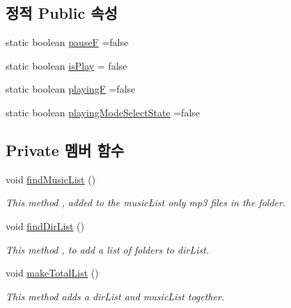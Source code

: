\subsection*{정적 Public 속성}
\begin{DoxyCompactItemize}
\item 
static boolean \hyperlink{classkr_1_1ac_1_1kookmin_1_1cs_1_1music_1_1_music_player_a9cbd432293e5e11088c6bfb4b31db11c}{pause\+F} =false
\item 
static boolean \hyperlink{classkr_1_1ac_1_1kookmin_1_1cs_1_1music_1_1_music_player_a51b544eb635ea19154536647d01a4994}{is\+Play} = false
\item 
static boolean \hyperlink{classkr_1_1ac_1_1kookmin_1_1cs_1_1music_1_1_music_player_af9d89823a5f820f1592ebe2acd21f711}{playing\+F} =false
\item 
static boolean \hyperlink{classkr_1_1ac_1_1kookmin_1_1cs_1_1music_1_1_music_player_ae2610567e63c44b6bba0eabdd1868e33}{playing\+Mode\+Select\+State} =false
\end{DoxyCompactItemize}
\subsection*{Private 멤버 함수}
\begin{DoxyCompactItemize}
\item 
void \hyperlink{classkr_1_1ac_1_1kookmin_1_1cs_1_1music_1_1_music_player_a51155c43158965823b24d0f69987be47}{find\+Music\+List} ()
\begin{DoxyCompactList}\small\item\em This method , added to the music\+List only mp3 files in the folder. \end{DoxyCompactList}\item 
void \hyperlink{classkr_1_1ac_1_1kookmin_1_1cs_1_1music_1_1_music_player_a449b2c9816ef1a55f8113b7155000d97}{find\+Dir\+List} ()
\begin{DoxyCompactList}\small\item\em This method , to add a list of folders to dir\+List. \end{DoxyCompactList}\item 
void \hyperlink{classkr_1_1ac_1_1kookmin_1_1cs_1_1music_1_1_music_player_ae4d53ac419495684317e05ae42885e8a}{make\+Total\+List} ()
\begin{DoxyCompactList}\small\item\em This method adds a dir\+List and music\+List together. \end{DoxyCompactList}\end{DoxyCompactItemize}
